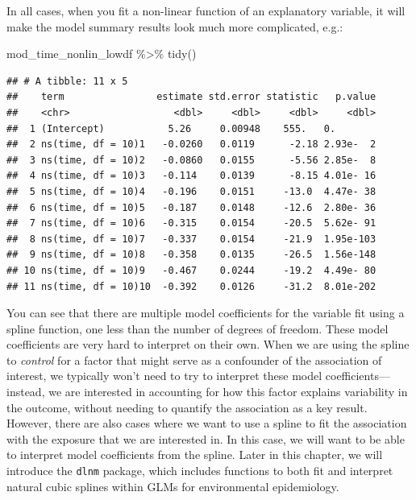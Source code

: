 \documentclass[
]{book}
\newenvironment{Shaded}{\begin{snugshade}}{\end{snugshade}}
\newcommand{\FunctionTok}[1]{\textcolor[rgb]{0.00,0.00,0.00}{#1}}
\newcommand{\NormalTok}[1]{#1}
\newcommand{\SpecialCharTok}[1]{\textcolor[rgb]{0.00,0.00,0.00}{#1}}
\begin{document}
In all cases, when you fit a non-linear function of an explanatory variable,
it will make the model summary results look much more complicated, e.g.:

\begin{Shaded}
\begin{Highlighting}[]
\NormalTok{mod\_time\_nonlin\_lowdf }\SpecialCharTok{\%\textgreater{}\%} 
  \FunctionTok{tidy}\NormalTok{()}
\end{Highlighting}
\end{Shaded}

\begin{verbatim}
## # A tibble: 11 x 5
##    term                estimate std.error statistic   p.value
##    <chr>                  <dbl>     <dbl>     <dbl>     <dbl>
##  1 (Intercept)           5.26     0.00948    555.   0.       
##  2 ns(time, df = 10)1   -0.0260   0.0119      -2.18 2.93e-  2
##  3 ns(time, df = 10)2   -0.0860   0.0155      -5.56 2.85e-  8
##  4 ns(time, df = 10)3   -0.114    0.0139      -8.15 4.01e- 16
##  5 ns(time, df = 10)4   -0.196    0.0151     -13.0  4.47e- 38
##  6 ns(time, df = 10)5   -0.187    0.0148     -12.6  2.80e- 36
##  7 ns(time, df = 10)6   -0.315    0.0154     -20.5  5.62e- 91
##  8 ns(time, df = 10)7   -0.337    0.0154     -21.9  1.95e-103
##  9 ns(time, df = 10)8   -0.358    0.0135     -26.5  1.56e-148
## 10 ns(time, df = 10)9   -0.467    0.0244     -19.2  4.49e- 80
## 11 ns(time, df = 10)10  -0.392    0.0126     -31.2  8.01e-202
\end{verbatim}

You can see that there are multiple model coefficients for the variable fit
using a spline function, one less than the number of degrees of freedom. These
model coefficients are very hard to interpret on their own. When we are using
the spline to \emph{control} for a factor that might serve as a confounder of the
association of interest, we typically won't need to try to interpret these
model coefficients---instead, we are interested in accounting for how this
factor explains variability in the outcome, without needing to quantify the
association as a key result. However, there are also cases where we want to
use a spline to fit the association with the exposure that we are interested
in. In this case, we will want to be able to interpret model coefficients from
the spline. Later in this chapter, we will introduce the \texttt{dlnm} package, which
includes functions to both fit and interpret natural cubic splines within
GLMs for environmental epidemiology.
\end{document}
